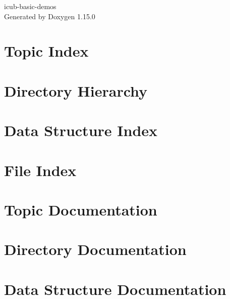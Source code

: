 \documentclass[twoside]{book}
\newcommand{\+}{\discretionary{\mbox{\scriptsize$\hookleftarrow$}}{}{}}
\newcommand{\clearemptydoublepage}{%
    \newpage{\pagestyle{empty}\cleardoublepage}%
  }
\begin{document}
  \raggedbottom
  \begin{titlepage}
  \vspace*{7cm}
  \begin{center}%
  {\Large icub-\/basic-\/demos}\\
  \vspace*{1cm}
  {\large Generated by Doxygen 1.15.0}\\
  \end{center}
  \end{titlepage}
  \clearemptydoublepage
  \tableofcontents
  \clearemptydoublepage
\chapter{Topic Index}

\chapter{Directory Hierarchy}

\chapter{Data Structure Index}

\chapter{File Index}

\chapter{Topic Documentation}




\chapter{Directory Documentation}


\chapter{Data Structure Documentation}

\end{document}
